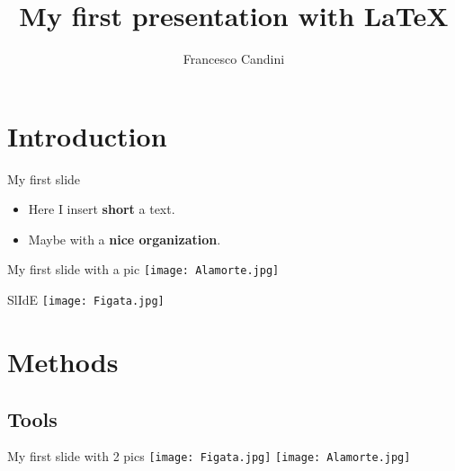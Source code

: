 \documentclass[]{beamer} %
\title{My first presentation with LaTeX}
\author[]{Francesco Candini}
\institute{Alma Mater Studiorum - University of Bologna} %
\begin{document}
\maketitle


\section{Introduction} %

\begin{frame}{My first slide}
    \begin{itemize}
        \item Here I insert \textbf{short} a text.
        \item \pause Maybe with a \textbf{nice organization}. 
    \end{itemize}
\end{frame}

\begin{frame}{My first slide with a pic}
\centering
\texttt{[image: Alamorte.jpg]}
\end{frame}

\begin{frame}{SlIdE}
\centering
\texttt{[image: Figata.jpg]}
\end{frame}


\section{Methods} %


\subsection{Tools} %

\begin{frame}{My first slide with 2 pics}
\centering
\texttt{[image: Figata.jpg]}
\texttt{[image: Alamorte.jpg]}
\end{frame}
\end{document}

